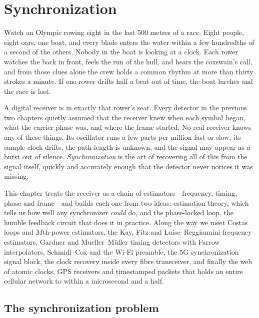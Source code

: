 \chapter{Synchronization}
\label{ch:sync}

\begin{chapterintro}
Watch an Olympic rowing eight in the last 500 metres of a race. Eight people, eight oars, one
boat, and every blade enters the water within a few hundredths of a second of the others. Nobody
in the boat is looking at a clock. Each rower watches the back in front, feels the run of the
hull, and hears the coxswain's call, and from those clues alone the crew holds a common rhythm
at more than thirty strokes a minute. If one rower drifts half a beat out of time, the boat
lurches and the race is lost.

A digital receiver is in exactly that rower's seat. Every detector in the previous two chapters
quietly assumed that the receiver knew when each symbol began, what the carrier phase was, and
where the frame started. No real receiver knows any of these things. Its oscillator runs a few
parts per million fast or slow, its sample clock drifts, the path length is unknown, and the
signal may appear as a burst out of silence. \emph{Synchronization} is the art of recovering all
of this from the signal itself, quickly and accurately enough that the detector never notices
it was missing.

This chapter treats the receiver as a chain of estimators---frequency, timing, phase and
frame---and builds each one from two ideas: estimation theory, which tells us how well any
synchronizer \emph{could} do, and the phase-locked loop, the humble feedback circuit that does it
in practice. Along the way we meet Costas loops and $M$th-power estimators, the Kay, Fitz and
Luise--Reggiannini frequency estimators, Gardner and Mueller--M\"uller timing detectors with
Farrow interpolators, Schmidl--Cox and the Wi-Fi preamble, the 5G synchronization signal block,
the clock recovery inside every fibre transceiver, and finally the web of atomic clocks, GPS
receivers and timestamped packets that holds an entire cellular network to within a microsecond
and a half.
\end{chapterintro}

\section{The synchronization problem}
\label{sec:ch10:problem}

